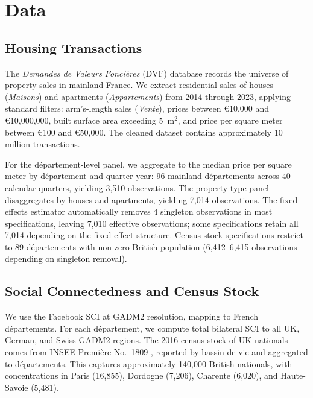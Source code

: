 \documentclass[12pt]{article}
\renewcommand{\EUR}[1]{\euro{}#1}
\begin{document}
\section{Data}\label{sec:data}

\subsection{Housing Transactions}

The \textit{Demandes de Valeurs Fonci\`eres} (DVF) database records the universe of property sales in mainland France. We extract residential sales of houses (\textit{Maisons}) and apartments (\textit{Appartements}) from 2014 through 2023, applying standard filters: arm's-length sales (\textit{Vente}), prices between \EUR{10,000} and \EUR{10,000,000}, built surface area exceeding 5~m$^2$, and price per square meter between \EUR{100} and \EUR{50,000}. The cleaned dataset contains approximately 10 million transactions.

For the d\'epartement-level panel, we aggregate to the median price per square meter by d\'epartement and quarter-year: 96 mainland d\'epartements across 40 calendar quarters, yielding 3,510 observations. The property-type panel disaggregates by houses and apartments, yielding 7,014 observations. The fixed-effects estimator automatically removes 4 singleton observations in most specifications, leaving 7,010 effective observations; some specifications retain all 7,014 depending on the fixed-effect structure. Census-stock specifications restrict to 89 d\'epartements with non-zero British population (6,412--6,415 observations depending on singleton removal).

\subsection{Social Connectedness and Census Stock}

We use the Facebook SCI at GADM2 resolution, mapping to French d\'epartements. For each d\'epartement, we compute total bilateral SCI to all UK, German, and Swiss GADM2 regions. The 2016 census stock of UK nationals comes from INSEE Premi\`ere No.\ 1809 \citep{insee2019premiere}, reported by bassin de vie and aggregated to d\'epartements. This captures approximately 140,000 British nationals, with concentrations in Paris (16,855), Dordogne (7,206), Charente (6,020), and Haute-Savoie (5,481).
\end{document}
